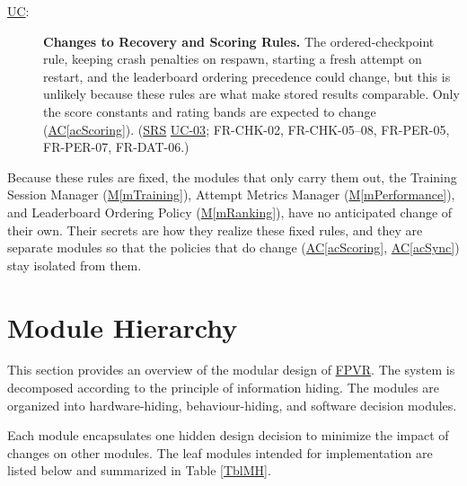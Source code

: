 \documentclass[12pt, titlepage]{article}
\DeclareRobustCommand{\mgabbr}[2]{\hyperlink{mg-abbr:#1}{#2}}
\newcommand{\acref}[1]{\mgabbr{ac}{AC}\ref{#1}}
\newcounter{ucnum}
\newcommand{\uctheucnum}{\mgabbr{uc}{UC}\theucnum}
\newcommand{\mref}[1]{\hyperref[#1]{M\ref*{#1}}}
\begin{document}
\begin{description}
\item[ \uctheucnum \label{ucRules}:]
\textbf{Changes to Recovery and Scoring Rules.}
The ordered-checkpoint rule, keeping crash penalties on
respawn, starting a fresh attempt on restart, and the
leaderboard ordering precedence could change, but this is
unlikely because these rules are what make stored results
comparable. Only the score constants and rating bands are
expected to change (\acref{acScoring}). (\mgabbr{srs}{SRS} \mgabbr{uc}{UC-03};
FR-CHK-02, FR-CHK-05--08, FR-PER-05, FR-PER-07, FR-DAT-06.)

\end{description}

Because these rules are fixed, the modules that only carry them out, the
Training Session Manager (\mref{mTraining}), Attempt Metrics Manager
(\mref{mPerformance}), and Leaderboard Ordering Policy (\mref{mRanking}),
have no anticipated change of their own. Their secrets are how they
realize these fixed rules, and they are separate modules so that the
policies that do change (\acref{acScoring}, \acref{acSync}) stay isolated
from them.


\section{Module Hierarchy} \label{SecMH}

This section provides an overview of the modular design of \mgabbr{fpvr}{FPVR}.
The system is decomposed according to the principle of information
hiding. The modules are organized into hardware-hiding,
behaviour-hiding, and software decision modules.

Each module encapsulates one hidden design decision to minimize the impact of
changes on other modules.
The leaf modules intended for implementation are listed below
and summarized in Table \ref{TblMH}.
\end{document}

